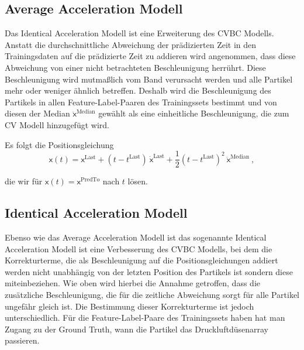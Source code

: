 \subsection{Average Acceleration Modell}




Das Identical Acceleration Modell ist eine Erweiterung des CVBC Modells.
Anstatt die durchschnittliche Abweichung der prädizierten Zeit in den Trainingsdaten auf die prädizierte Zeit zu addieren wird angenommen, 
dass diese Abweichung von einer nicht betrachteten Beschleunigung herrührt.
Diese Beschleunigung wird mutmaßlich vom Band verursacht werden und alle Partikel mehr oder weniger ähnlich betreffen.
Deshalb wird die Beschleunigung des Partikels in allen Feature-Label-Paaren des Trainingssets bestimmt
und von diesen der Median \(\ddot{ \mathsf{x}}^{\text{Median}}\) gewählt als eine einheitliche Beschleunigung, die zum CV Modell hinzugefügt wird.

Es folgt die Positionsgleichung
\begin{equation*}
    \mathsf{x}(t) =  \mathsf{x}^{\text{Last}} + (t - t^{\text{Last}}) \: \dot{ \mathsf{x}}^{\text{Last}} 
    + \frac{1}{2} (t - t^{\text{Last}})^2 \: \ddot{ \mathsf{x}}^{\text{Median}} \: ,
\end{equation*}

die wir für \(\mathsf{x}(t) =  \mathsf{x}^{\text{PredTo}}\) nach \(t\) lösen.


\subsection{Identical Acceleration Modell}


Ebenso wie das Average Acceleration Modell ist das  sogenannte Identical Acceleration Modell ist eine Verbesserung des CVBC Modells, 
bei dem die Korrekturterme, die als Beschleunigung auf die Positionsgleichungen addiert werden nicht unabhängig von der letzten Position des Partikels ist sondern diese miteinbeziehen.
Wie oben wird hierbei die Annahme getroffen, dass die zusätzliche Beschleunigung, die für die zeitliche Abweichung sorgt für alle Partikel ungefähr gleich ist.
Die Bestimmung dieser Korrekturterme ist jedoch unterschiedlich.
Für die Feature-Label-Paare des Trainingssets haben hat man Zugang zu der Ground Truth, wann die Partikel das Druckluftdüsenarray passieren.

